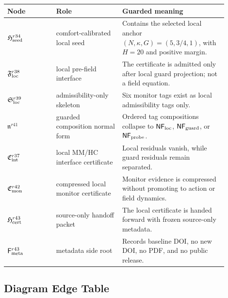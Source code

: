 \begin{longtable}{P{0.20\linewidth}P{0.27\linewidth}P{0.43\linewidth}}
\toprule
Node & Role & Guarded meaning \\
\midrule
\endhead
\(\mathfrak H_{\rm seed}^{r34}\) & comfort-calibrated local seed & Contains the selected local anchor \((N,\kappa,G)=(5,3/4,1)\), with \(H=20\) and positive margin. \\
\(\mathfrak F_{\rm loc}^{r38}\) & local pre-field interface & The certificate is admitted only after local guard projection; not a field equation. \\
\(\mathfrak S_{\rm loc}^{r39}\) & admissibility-only skeleton & Six monitor tags exist as local admissibility tags only. \\
\(\mathfrak n^{r41}\) & guarded composition normal form & Ordered tag compositions collapse to \(\mathsf{NF}_{\rm loc}\), \(\mathsf{NF}_{\rm guard}\), or \(\mathsf{NF}_{\rm probe}\). \\
\(\mathfrak C_{\rm int}^{r37}\) & local MM/HC interface certificate & Local residuals vanish, while guard residuals remain separated. \\
\(\mathfrak C_{\rm mon}^{r42}\) & compressed local monitor certificate & Monitor evidence is compressed without promoting to action or field dynamics. \\
\(\mathfrak H_{\rm cert}^{r43}\) & source-only handoff packet & The local certificate is handed forward with frozen source-only metadata. \\
\(\mathsf F_{\rm meta}^{r43}\) & metadata side root & Records baseline DOI, no new DOI, no PDF, and no public release. \\
\bottomrule
\end{longtable}

\subsection{Diagram Edge Table}
\label{subsec:r51-edge-table}

